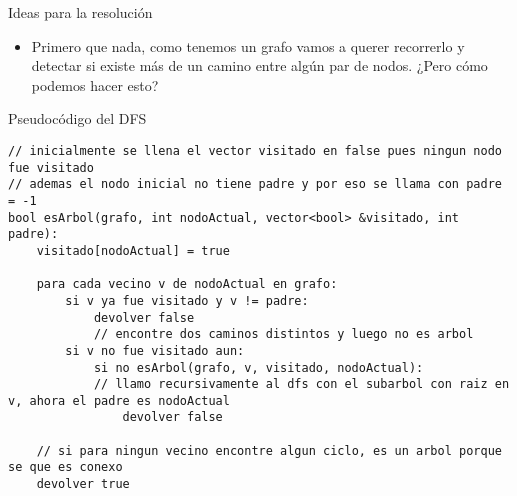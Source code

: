\documentclass[compress]{beamer}
\begin{document}
\begin{frame}{Ideas para la resolución}
\begin{itemize}
\item Primero que nada, como tenemos un grafo vamos a querer recorrerlo y detectar si existe más de un camino entre algún par de nodos. ¿Pero cómo podemos hacer esto?
\pause
{}
\pause
{}
\end{itemize}
\end{frame}



\begin{frame}[fragile]{Pseudocódigo del DFS}
\begin{lstlisting}
// inicialmente se llena el vector visitado en false pues ningun nodo fue visitado
// ademas el nodo inicial no tiene padre y por eso se llama con padre = -1
bool esArbol(grafo, int nodoActual, vector<bool> &visitado, int padre):
    visitado[nodoActual] = true 

    para cada vecino v de nodoActual en grafo:
        si v ya fue visitado y v != padre:
            devolver false
            // encontre dos caminos distintos y luego no es arbol
        si v no fue visitado aun:
            si no esArbol(grafo, v, visitado, nodoActual): 
            // llamo recursivamente al dfs con el subarbol con raiz en v, ahora el padre es nodoActual
                devolver false
    
    // si para ningun vecino encontre algun ciclo, es un arbol porque se que es conexo
    devolver true
		
\end{lstlisting}
\end{frame}
\end{document}
